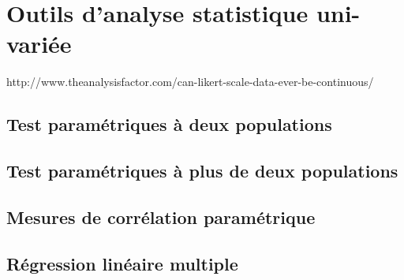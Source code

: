 \chapter{Outils d'analyse statistique uni-variée}
\label{app:statuni}

http://www.theanalysisfactor.com/can-likert-scale-data-ever-be-continuous/

\section{Test paramétriques à deux populations}
\label{app:student}

\section{Test paramétriques à plus de deux populations}
\label{app:anova}

\section{Mesures de corrélation paramétrique}
\label{app:corr}

\section{Régression linéaire multiple}
\label{app:regressionMultiple}
